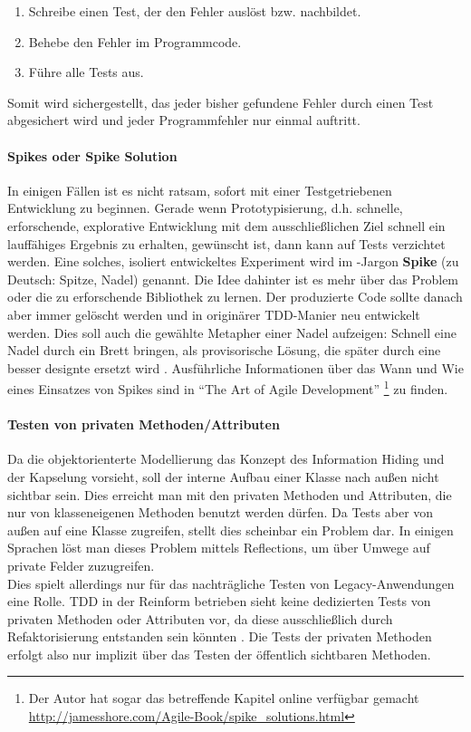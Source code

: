   \begin{enumerate}
   \item Schreibe einen Test, der den Fehler auslöst bzw. nachbildet.
   \item Behebe den Fehler im Programmcode.
   \item Führe alle Tests aus.
  \end{enumerate}
  Somit wird sichergestellt, das jeder bisher gefundene Fehler durch einen Test abgesichert wird und jeder Programmfehler nur einmal auftritt.
  \paragraph{Spikes oder Spike Solution} In einigen Fällen ist es nicht ratsam, sofort mit einer Testgetriebenen Entwicklung zu beginnen. Gerade wenn Prototypisierung, d.h. schnelle, erforschende, explorative Entwicklung mit dem ausschließlichen Ziel schnell ein lauffähiges Ergebnis zu erhalten, gewünscht ist, dann kann auf Tests verzichtet werden. Eine solches, isoliert entwickeltes Experiment wird im -Jargon \textbf{Spike} (zu Deutsch: Spitze, Nadel) genannt. Die Idee dahinter ist es mehr über das Problem oder die zu erforschende Bibliothek zu lernen. Der produzierte Code sollte danach aber immer gelöscht werden und in originärer TDD-Manier neu entwickelt werden. Dies soll auch die gewählte Metapher einer Nadel aufzeigen: Schnell eine Nadel durch ein Brett bringen, als provisorische Lösung, die später durch eine besser designte ersetzt wird \citep{shore_art_2007}. Ausführliche Informationen über das Wann und Wie eines Einsatzes von Spikes sind in "`The Art of Agile Development"' \citep{shore_art_2007}\footnote{Der Autor hat sogar das betreffende Kapitel online verfügbar gemacht \url{http://jamesshore.com/Agile-Book/spike_solutions.html}} zu finden.

  \paragraph{Testen von privaten Methoden/Attributen} Da die objektorienterte Modellierung das Konzept des Information Hiding und der Kapselung vorsieht, soll der interne Aufbau einer Klasse nach außen nicht sichtbar sein. Dies erreicht man mit den privaten Methoden und Attributen, die nur von klasseneigenen Methoden benutzt werden dürfen. Da Tests aber von außen auf eine Klasse zugreifen, stellt dies scheinbar ein Problem dar. In einigen Sprachen löst man dieses Problem mittels Reflections, um über Umwege auf private Felder zuzugreifen. \\
  Dies spielt allerdings nur für das nachträgliche Testen von Legacy-Anwendungen eine Rolle. TDD in der Reinform betrieben sieht keine dedizierten Tests von privaten Methoden oder Attributen vor, da diese ausschließlich durch Refaktorisierung entstanden sein könnten \citep{caroli_agile_2008}. Die Tests der privaten Methoden erfolgt also nur implizit über das Testen der öffentlich sichtbaren Methoden.


